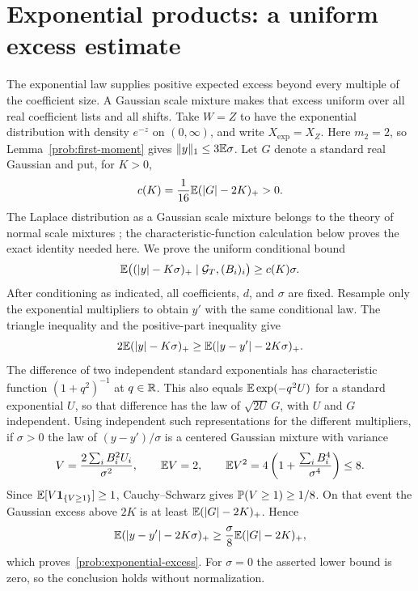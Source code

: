 \section{Exponential products: a uniform excess estimate}\label{sec:exponential}
The exponential law supplies positive expected excess beyond every multiple
of the coefficient size. A Gaussian scale mixture makes that excess uniform
over all real coefficient lists and all shifts.
Take $W=Z$ to have the exponential distribution with density $e^{-z}$ on
$(0,\infty)$, and write $X_{\mathrm{exp}}=X_Z$.  Here $m_2=2$, so
Lemma~\ref{prob:first-moment} gives $\lVert y\rVert_1\le3\mathbb E\sigma$.
Let $G$ denote a standard real Gaussian and put, for $K>0$,
\begin{equation}\label{prob:excess-constant}
 c(K)=\frac1{16}\mathbb E(|G|-2K)_+>0.
\end{equation}
The Laplace distribution as a Gaussian scale mixture belongs to the theory
of normal scale mixtures \cite{AndrewsMallows1974}; the characteristic-function
calculation below proves the exact identity needed here.
We prove the uniform conditional bound
\begin{equation}\label{prob:exponential-excess}
 \mathbb E\bigl((|y|-K\sigma)_+\mid\mathcal G_T,(B_i)_i\bigr)
 \ge c(K)\sigma.
\end{equation}
After conditioning as indicated, all coefficients, $d$, and $\sigma$ are
fixed.  Resample only the exponential multipliers to obtain $y'$ with the
same conditional law.  The triangle inequality and the positive-part
inequality give
\[
 2\mathbb E(|y|-K\sigma)_+
 \ge\mathbb E(|y-y'|-2K\sigma)_+.
\]
The difference of two independent standard exponentials has characteristic
function $(1+q^2)^{-1}$ at $q\in\mathbb R$.  This also equals
$\mathbb E\exp(-q^2U)$ for a standard exponential $U$, so that difference has the
law of $\sqrt{2U}\,G$, with $U$ and $G$ independent.  Using independent
such representations for the different multipliers, if $\sigma>0$ the
law of $(y-y')/\sigma$ is a centered Gaussian mixture with variance
\[
 V=\frac{2\sum_iB_i^2U_i}{\sigma^2},\qquad
 \mathbb E V=2,\qquad
 \mathbb E V^2=4\left(1+\frac{\sum_iB_i^4}{\sigma^4}\right)\le8.
\]
Since $\mathbb E[V\mathbf1_{\{V\ge1\}}]\ge1$, Cauchy--Schwarz gives
$\mathbb P(V\ge1)\ge1/8$.  On that event the Gaussian excess above $2K$ is at
least $\mathbb E(|G|-2K)_+$.  Hence
\[
 \mathbb E(|y-y'|-2K\sigma)_+
 \ge\frac{\sigma}{8}\mathbb E(|G|-2K)_+,
\]
which proves~\eqref{prob:exponential-excess}.  For $\sigma=0$ the asserted
lower bound is zero, so the conclusion holds without normalization.


